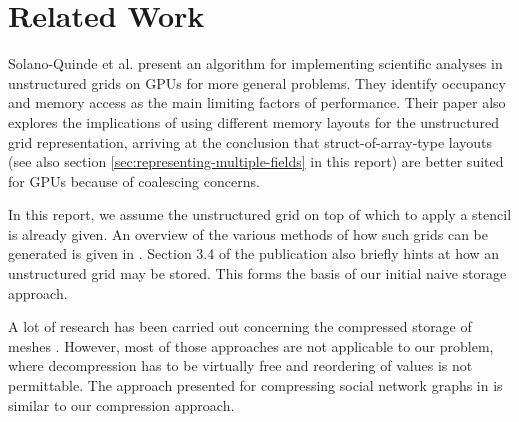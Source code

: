 \chapter{Related Work}

Solano-Quinde et al. \cite{solano2011} present an algorithm for implementing scientific analyses in unstructured grids on GPUs for more general problems. They identify occupancy and memory access as the main limiting factors of performance. Their paper also explores the implications of using different memory layouts for the unstructured grid representation, arriving at the conclusion that struct-of-array-type layouts (see also section \ref{sec:representing-multiple-fields} in this report) are better suited for GPUs because of coalescing concerns. 

In this report, we assume the unstructured grid on top of which to apply a stencil is already given. An overview of the various methods of how such grids can be generated is given in \cite{mavriplis1997}. Section 3.4 of the publication also briefly hints at how an unstructured grid may be stored. This forms the basis of our initial naive storage approach.

A lot of research has been carried out concerning the compressed storage of meshes \cite{edgebreaker}\cite{edgebreaker-quadrilateral}. However, most of those approaches are not applicable to our problem, where decompression has to be virtually free and reordering of values is not permittable. The approach presented for compressing social network graphs in \cite{social} is similar to our compression approach.